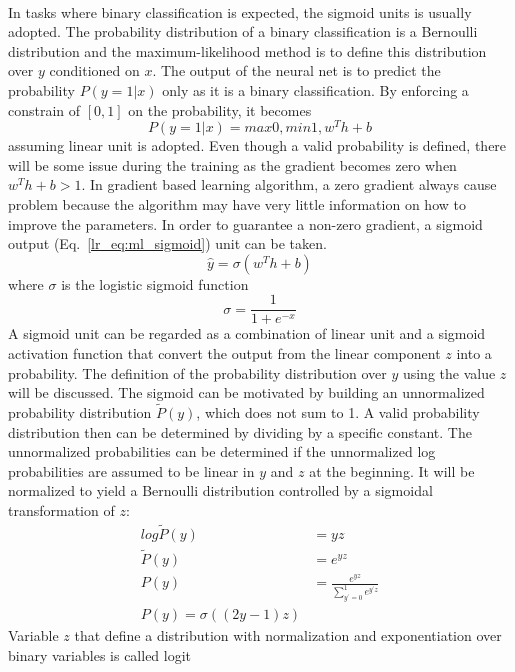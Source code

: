 \paragraph{}
In tasks where binary classification is expected, the sigmoid units is usually adopted.
The probability distribution of a binary classification is a Bernoulli distribution and the maximum-likelihood method is to define this distribution over $y$ conditioned on $x$.
The output of the neural net is to predict the probability $P(y=1|x)$ only as it is a binary classification.
By enforcing a constrain of $[0,1]$ on the probability, it becomes
\begin{equation}
    P(y=1|x) = max{0,min{1, w^T h + b}}
\end{equation}
%
assuming linear unit is adopted.
Even though a valid probability is defined, there will be some issue during the training as the gradient becomes zero when $w^T h +b>1$.
In gradient based learning algorithm, a zero gradient always cause problem because the algorithm may have very little information on how to improve the parameters.
In order to guarantee a non-zero gradient, a sigmoid output (Eq.~\ref{lr_eq:ml_sigmoid}) unit can be taken.
\begin{equation}
    \hat{y} = \sigma (w^T h +b)
    \label{lr_eq:ml_sigmoid}
\end{equation}
where $\sigma$ is the logistic sigmoid function
\begin{equation}
    \sigma = \frac{1}{1+e^{-x}}
\end{equation}
%
A sigmoid unit can be regarded as a combination of linear unit and a sigmoid activation function that convert the output from the linear component $z$ into a probability.
The definition of the probability distribution over $y$ using the value $z$ will be discussed.
The sigmoid can be motivated by building an unnormalized probability distribution $\tilde{P}(y)$, which does not sum to 1.
A valid probability distribution then can be determined by dividing by a specific constant.
The unnormalized probabilities can be determined if the unnormalized log probabilities are assumed to be linear in $y$ and $z$ at the beginning.
It will be normalized to yield a Bernoulli distribution controlled by a sigmoidal transformation of $z$:
\begin{equation}
    \begin{aligned}
        log \tilde{P} (y) &= yz \\
        \tilde{P} (y) &= e^{yz} \\
        P(y) &= \frac{e^{yz}}{\sum_{y^\prime=0}^1 e^{y^\prime z}} \\
        P(y) = \sigma ((2y-1)z)
    \end{aligned}
\end{equation}
%
Variable $z$ that define a distribution with normalization and exponentiation over binary variables is called logit

